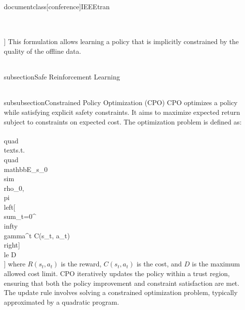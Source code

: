 \\documentclass[conference]{IEEEtran}
\begin{document}
\\[
L_{\\pi}(\\phi) = \\mathbb{E}_{s,a \\sim \\mathcal{D}} \\left[ \\exp \\left( \\frac{Q_{\\theta}(s,a) - V_{\\psi}(s)}{k} \\right) \\log \\pi_{\\phi}(a|s) \\right]
\\]
This formulation allows learning a policy that is implicitly constrained by the quality of the offline data.

\\subsection{Safe Reinforcement Learning}

\\subsubsection{Constrained Policy Optimization (CPO)}
CPO optimizes a policy while satisfying explicit safety constraints. It aims to maximize expected return subject to constraints on expected cost.
The optimization problem is defined as:
\\[
\\max_{\\pi} \\mathbb{E}_{s_0 \\sim \\rho_0, \\pi} \\left[ \\sum_{t=0}^{\\infty} \\gamma^t R(s_t, a_t) \\right] \\quad \\text{s.t.} \\quad \\mathbb{E}_{s_0 \\sim \\rho_0, \\pi} \\left[ \\sum_{t=0}^{\\infty} \\gamma^t C(s_t, a_t) \\right] \\le D
\\]
where $R(s_t, a_t)$ is the reward, $C(s_t, a_t)$ is the cost, and $D$ is the maximum allowed cost limit.
CPO iteratively updates the policy within a trust region, ensuring that both the policy improvement and constraint satisfaction are met. The update rule involves solving a constrained optimization problem, typically approximated by a quadratic program.
\end{document}
